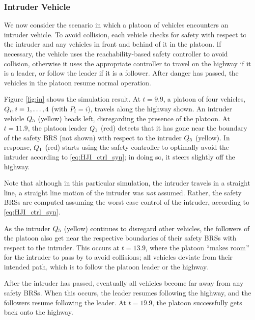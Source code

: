 \subsubsection{Intruder Vehicle}
We now consider the scenario in which a platoon of vehicles encounters an intruder vehicle. To avoid collision, each vehicle checks for safety with respect to the intruder and any vehicles in front and behind of it in the platoon. If necessary, the vehicle uses the reachability-based safety controller to avoid collision, otherwise it uses the appropriate controller to travel on the highway if it is a leader, or follow the leader if it is a follower. After danger has passed, the vehicles in the platoon resume normal operation.

Figure \ref{fig:in} shows the simulation result. At $t=9.9$, a platoon of four vehicles, $Q_{i},i=1,\ldots,4$ (with $P_i = i$), travels along the highway shown. An intruder vehicle $Q_{5}$ (yellow) heads left, disregarding the presence of the platoon. At $t=11.9$, the platoon leader $Q_{1}$ (red) detects that it has gone near the boundary of the safety BRS (not shown) with respect to the intruder $Q_{5}$ (yellow). In response, $Q_{1}$ (red) starts using the safety controller to optimally avoid the intruder according to \eqref{eq:HJI_ctrl_syn}; in doing so, it steers slightly off the highway. 

Note that although in this particular simulation, the intruder travels in a straight line, a straight line motion of the intruder was \textit{not} assumed. Rather, the safety BRSs are computed assuming the worst case control of the intruder, according to \eqref{eq:HJI_ctrl_syn}.

As the intruder $Q_{5}$ (yellow) continues to disregard other vehicles, the followers of the platoon also get near the respective boundaries of their safety BRSs with respect to the intruder. This occurs at $t=13.9$, where the platoon ``makes room'' for the intruder to pass by to avoid collisions; all vehicles deviate from their intended path, which is to follow the platoon leader or the highway. 

After the intruder has passed, eventually all vehicles become far away from any safety BRSs. When this occurs, the leader resumes following the highway, and the followers resume following the leader. At $t=19.9$, the platoon successfully gets back onto the highway.

